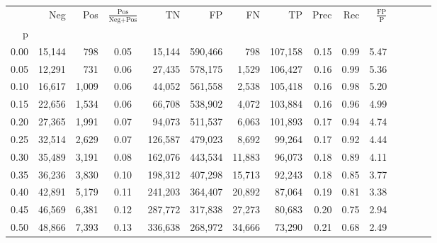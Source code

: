 \begin{tabular}{rrrcrrrrrrrrrrr}
\toprule
{} &     Neg &    Pos & $\frac{\text{Pos}}{\text{Neg}+\text{Pos}}$ &       TN &       FP &       FN &       TP &  Prec &   Rec & $\frac{\text{FP}}{\text{P}}$ \\
p    &         &        &                                            &          &          &          &          &       &       &                              \\
\midrule
0.00 &  15,144 &    798 &                                       0.05 &   15,144 &  590,466 &      798 &  107,158 &  0.15 &  0.99 &                         5.47 \\
0.05 &  12,291 &    731 &                                       0.06 &   27,435 &  578,175 &    1,529 &  106,427 &  0.16 &  0.99 &                         5.36 \\
0.10 &  16,617 &  1,009 &                                       0.06 &   44,052 &  561,558 &    2,538 &  105,418 &  0.16 &  0.98 &                         5.20 \\
0.15 &  22,656 &  1,534 &                                       0.06 &   66,708 &  538,902 &    4,072 &  103,884 &  0.16 &  0.96 &                         4.99 \\
0.20 &  27,365 &  1,991 &                                       0.07 &   94,073 &  511,537 &    6,063 &  101,893 &  0.17 &  0.94 &                         4.74 \\
0.25 &  32,514 &  2,629 &                                       0.07 &  126,587 &  479,023 &    8,692 &   99,264 &  0.17 &  0.92 &                         4.44 \\
0.30 &  35,489 &  3,191 &                                       0.08 &  162,076 &  443,534 &   11,883 &   96,073 &  0.18 &  0.89 &                         4.11 \\
0.35 &  36,236 &  3,830 &                                       0.10 &  198,312 &  407,298 &   15,713 &   92,243 &  0.18 &  0.85 &                         3.77 \\
0.40 &  42,891 &  5,179 &                                       0.11 &  241,203 &  364,407 &   20,892 &   87,064 &  0.19 &  0.81 &                         3.38 \\
0.45 &  46,569 &  6,381 &                                       0.12 &  287,772 &  317,838 &   27,273 &   80,683 &  0.20 &  0.75 &                         2.94 \\
0.50 &  48,866 &  7,393 &                                       0.13 &  336,638 &  268,972 &   34,666 &   73,290 &  0.21 &  0.68 &                         2.49 \\

\end{tabular}
